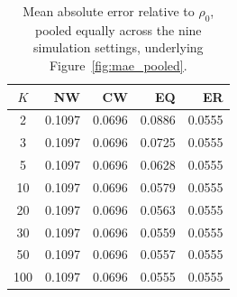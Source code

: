 \begin{table}[!t]
\caption{Mean absolute error relative to $\rho_0$, pooled equally across the nine simulation settings, underlying Figure~\ref{fig:mae_pooled}.}
\label{tab:supp_mae_pooled}
\centering\small\setlength{\tabcolsep}{7pt}
\begin{tabular}{crrrr}
\toprule
$K$ & NW & CW & EQ & ER \\
\midrule
2 & 0.1097 & 0.0696 & 0.0886 & 0.0555 \\
3 & 0.1097 & 0.0696 & 0.0725 & 0.0555 \\
5 & 0.1097 & 0.0696 & 0.0628 & 0.0555 \\
10 & 0.1097 & 0.0696 & 0.0579 & 0.0555 \\
20 & 0.1097 & 0.0696 & 0.0563 & 0.0555 \\
30 & 0.1097 & 0.0696 & 0.0559 & 0.0555 \\
50 & 0.1097 & 0.0696 & 0.0557 & 0.0555 \\
100 & 0.1097 & 0.0696 & 0.0555 & 0.0555 \\
\bottomrule
\end{tabular}
\end{table}
